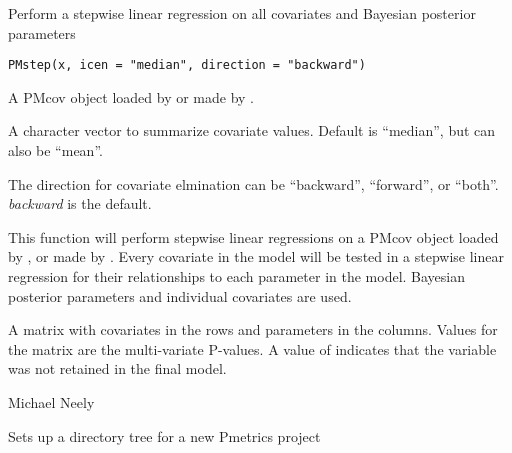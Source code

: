 \documentclass[a4paper]{book}
\begin{document}
%
\begin{Description}\relax
Perform a stepwise linear regression on all covariates and Bayesian posterior parameters
\end{Description}
%
\begin{Usage}
\begin{verbatim}
PMstep(x, icen = "median", direction = "backward")
\end{verbatim}
\end{Usage}
%
\begin{Arguments}
\begin{ldescription}
\item[\code{x}] A PMcov object loaded by 
or made by .

\item[\code{icen}] A character vector to summarize covariate values.  Default is ``median'', but can also be 
``mean''.

\item[\code{direction}] The direction for covariate elmination can be ``backward'', ``forward'', or ``both''.
\emph{backward} is the default.
\end{ldescription}
\end{Arguments}
%
\begin{Details}\relax
This function will perform stepwise linear regressions on a PMcov object loaded by ,
or made by .  Every covariate in the model will be tested in a stepwise linear regression for their relationships
to each parameter in the model.  Bayesian posterior parameters and individual covariates are used.
\end{Details}
%
\begin{Value}
A matrix with covariates in the rows and parameters in the columns.  Values for the matrix are the multi-variate P-values.
A value of  indicates that the variable was not retained in the final model.
\end{Value}
%
\begin{Author}\relax
Michael Neely
\end{Author}
%
\begin{SeeAlso}\relax
{}
\end{SeeAlso}
%
\begin{Description}\relax
Sets up a directory tree for a new Pmetrics project
\end{Description}
\end{document}
